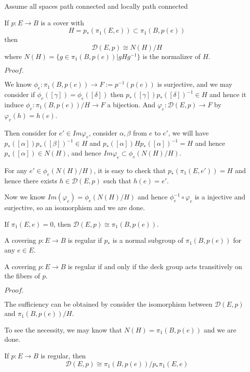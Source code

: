 \documentclass{article}
\newcommand{\Pf}[1]{$Proof.$\par}
\begin{document}
Assume all spaces path connected and locally path connected

\begin{theorem}
    If $p:E\to B$ is a cover with
    \[H = p_*(\pi_1(E,e)) \subset \pi_1(B,p(e))\]
    then 
    \[\mathcal{D}(E,p) \cong N(H)/H\]
    where $N(H) = \{g\in \pi_1(B,p(e))|gHg^{-1}\}$ is the normalizer of $H$.
\end{theorem}
\Pf\par
    We know $\phi_e:\pi_1(B,p(e)) \to F:=p^{-1}(p(e))$ is surjective, and we may consider if $\phi_e([\gamma]) = \phi_e([\delta])$ then $p_*([\gamma])p_*([\delta])^{-1} \in H$ and hence it induce $\phi_e: \pi_1(B,p(e))/H \to F$ a bijection. And $\varphi_e:\mathcal{D}(E,p)\to F$ by $\varphi_e(h) = h(e)$.\par
    Then consider for $e'\in Im\varphi_e$, consider $\alpha,\beta$ from $e$ to $e'$, we will have $p_*([\alpha])p_*([\beta])^{-1} \in H$ and $p_*([\alpha])Hp_*([\alpha])^{-1} = H$ and hence $p_*([\alpha]) \in N(H)$, and hence $Im\varphi_e \subset \phi_e(N(H)/H)$.\par
    For any $e' \in \phi_e(N(H)/H)$, it is easy to check that $p_*(\pi_1(E,e')) = H$ and hence there exists $h\in\mathcal{D}(E,p)$ such that $h(e) = e'$.\par
    Now we know $Im(\varphi_e) = \phi_e(N(H)/H)$ and hence $\phi_e^{-1}\circ \varphi_e$ is a injective and surjective, so an isomorphism and we are done.     

\begin{corollary}
    If $\pi_1(E,e) = 0$, then $\mathcal{D}(E,p) \cong \pi_1(B,p(e))$. 
\end{corollary}

\begin{definition}
    A covering $p:E\to B$ is regular if $p_*$ is a normal subgroup of $\pi_1(B,p(e))$ for any $e\in E$.
\end{definition}

\begin{proposition}
    A covering $p:E\to B$ is regular if and only if the deck group acts transitively on the fibers of $p$.
\end{proposition}
\Pf\par
    The sufficiency can be obtained by consider the isomorphism between $\mathcal{D}(E,p)$ and $\pi_1(B,p(e))/H$.\par
    To see the necessity, we may know that $N(H) = \pi_1(B,p(e))$ and we are done.

\begin{corollary}
    If $p:E\to B$ is regular, then
    \[\mathcal{D}(E,p) \cong \pi_1(B,p(e))/p_*\pi_1(E,e)\]
\end{corollary}
\end{document}
